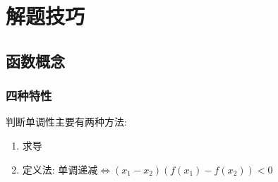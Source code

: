 \section{解题技巧}
\subsection{函数概念}
\subsubsection{四种特性}
判断单调性主要有两种方法:
\begin{enumerate}
	\item 求导
	\item 定义法: 单调递减$ \Leftrightarrow (x_{1}-x_{2})(f(x_{1})-f(x_{2}))<0 $
\end{enumerate}


















